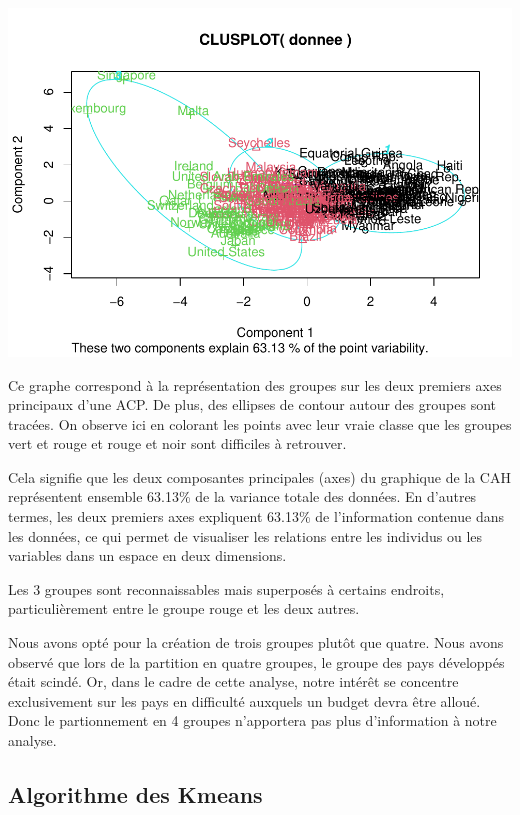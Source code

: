 \documentclass[
]{article}
\begin{document}
\includegraphics{Projet_files/figure-latex/unnamed-chunk-19-1.pdf}

Ce graphe correspond à la représentation des groupes sur les deux
premiers axes principaux d'une ACP. De plus, des ellipses de contour
autour des groupes sont tracées. On observe ici en colorant les points
avec leur vraie classe que les groupes vert et rouge et rouge et noir
sont difficiles à retrouver.

Cela signifie que les deux composantes principales (axes) du graphique
de la CAH représentent ensemble 63.13\% de la variance totale des
données. En d'autres termes, les deux premiers axes expliquent 63.13\%
de l'information contenue dans les données, ce qui permet de visualiser
les relations entre les individus ou les variables dans un espace en
deux dimensions.

Les 3 groupes sont reconnaissables mais superposés à certains endroits,
particulièrement entre le groupe rouge et les deux autres.

Nous avons opté pour la création de trois groupes plutôt que quatre.
Nous avons observé que lors de la partition en quatre groupes, le groupe
des pays développés était scindé. Or, dans le cadre de cette analyse,
notre intérêt se concentre exclusivement sur les pays en difficulté
auxquels un budget devra être alloué. Donc le partionnement en 4 groupes
n'apportera pas plus d'information à notre analyse.

\hypertarget{algorithme-des-kmeans}{%
\subsection{Algorithme des Kmeans}\label{algorithme-des-kmeans}}
\end{document}

